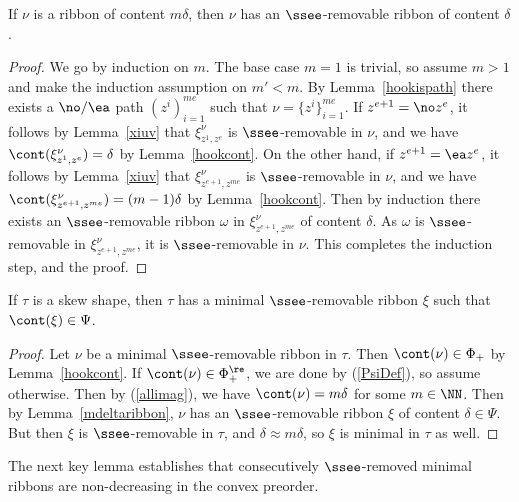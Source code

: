 \begin{lemma}\label{mdeltaribbon}
If \(\nu\) is a ribbon of content \(m\delta\), then \(\nu\) has an \(\ssee\)-removable ribbon of content \(\delta\).
\end{lemma}
\begin{proof}
We go by induction on \(m\). The base case \(m=1\) is trivial, so assume \(m>1\) and make the induction assumption on \(m' < m\). By Lemma~\ref{hookispath} there exists a \(\no/\ea\) path \((z^i)_{i=1}^{me}\) such that \(\nu = \{z^i\}_{i=1}^{me}\). If \(z^{e+1} = \no z^e\), it follows by Lemma~\ref{xiuv} that \(\xi^\nu_{z^1, z^e}\) is \(\ssee\)-removable in \(\nu\), and we have \(\cont(\xi^\nu_{z^1,z^e}) = \delta\) by Lemma~\ref{hookcont}. On the other hand, if \(z^{e+1} = \ea z^e\), it follows by Lemma~\ref{xiuv} that \(\xi^\nu_{z^{e+1}, z^{me}}\) is \(\ssee\)-removable in \(\nu\), and we have \(\cont(\xi^\nu_{z^{e+1}, z^{me}}) = (m-1)\delta\) by Lemma~\ref{hookcont}. Then by induction there exists an \(\ssee\)-removable ribbon \(\omega\) in \(\xi^\nu_{z^{e+1}, z^{me}}\) of content \(\delta\). As \(\omega\) is \(\ssee\)-removable in \(\xi^\nu_{z^{e+1}, z^{me}}\), it is \(\ssee\)-removable in \(\nu\). This completes the induction step, and the proof.
\end{proof}


\begin{lemma}\label{minremexist}
If \(\tau\) is a skew shape, then \(\tau\) has a minimal \(\ssee\)-removable ribbon \(\xi\) such that \(\cont(\xi) \in \Psi\).
\end{lemma}
\begin{proof}
Let \(\nu\) be a minimal \(\ssee\)-removable ribbon in \(\tau\). Then \(\cont(\nu) \in \Phi_+\) by Lemma~\ref{hookcont}. If \(\cont(\nu) \in \Phi_+^\re\), we are done by (\ref{PsiDef}), so assume otherwise. Then 
by (\ref{allimag}), we have \(\cont(\nu) = m\delta\) for some \(m\in \NN\).
Then by Lemma~\ref{mdeltaribbon}, \(\nu\) has an \(\ssee\)-removable ribbon \(\xi\) of content \(\delta \in \Psi\). But then \(\xi\) is \(\ssee\)-removable in \(\tau\), and \(\delta \approx m\delta\), so \(\xi\) is minimal in \(\tau\) as well.
\end{proof}

The next key lemma establishes that consecutively \(\ssee\)-removed minimal ribbons are non-decreasing in the convex preorder. 

